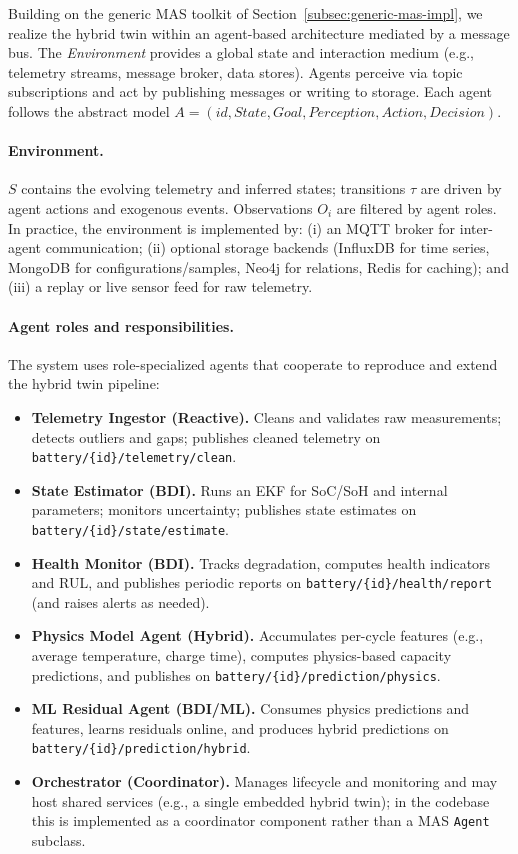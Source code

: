 Building on the generic MAS toolkit of Section~\ref{subsec:generic-mas-impl}, we realize the hybrid twin within an agent-based architecture mediated by a message bus. The \emph{Environment} provides a global state and interaction medium (e.g., telemetry streams, message broker, data stores). Agents perceive via topic subscriptions and act by publishing messages or writing to storage. Each agent follows the abstract model $A=(id,State,Goal,Perception,Action,Decision)$.

\paragraph{Environment.} $S$ contains the evolving telemetry and inferred states; transitions $\tau$ are driven by agent actions and exogenous events. Observations $O_i$ are filtered by agent roles. In practice, the environment is implemented by: (i) an MQTT broker for inter-agent communication; (ii) optional storage backends (InfluxDB for time series, MongoDB for configurations/samples, Neo4j for relations, Redis for caching); and (iii) a replay or live sensor feed for raw telemetry.

\paragraph{Agent roles and responsibilities.} The system uses role-specialized agents that cooperate to reproduce and extend the hybrid twin pipeline:
\begin{itemize}
  \item \textbf{Telemetry Ingestor (Reactive).} Cleans and validates raw measurements; detects outliers and gaps; publishes cleaned telemetry on \texttt{battery/\{id\}/telemetry/clean}.
  \item \textbf{State Estimator (BDI).} Runs an EKF for SoC/SoH and internal parameters; monitors uncertainty; publishes state estimates on \texttt{battery/\{id\}/state/estimate}.
  \item \textbf{Health Monitor (BDI).} Tracks degradation, computes health indicators and RUL, and publishes periodic reports on \texttt{battery/\{id\}/health/report} (and raises alerts as needed).
  \item \textbf{Physics Model Agent (Hybrid).} Accumulates per-cycle features (e.g., average temperature, charge time), computes physics-based capacity predictions, and publishes on \texttt{battery/\{id\}/prediction/physics}.
  \item \textbf{ML Residual Agent (BDI/ML).} Consumes physics predictions and features, learns residuals online, and produces hybrid predictions on \texttt{battery/\{id\}/prediction/hybrid}.
  \item \textbf{Orchestrator (Coordinator).} Manages lifecycle and monitoring and may host shared services (e.g., a single embedded hybrid twin); in the codebase this is implemented as a coordinator component rather than a MAS \texttt{Agent} subclass.
\end{itemize}

